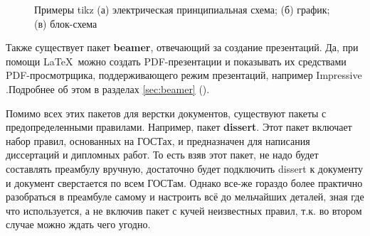 \begin{figure}[!ht]

    \caption{Примеры tikz (а) электрическая принципиальная схема; (б) график; (в) блок-схема}
    \label{fig:tikzex}
\end{figure}

Также существует пакет \textbf{beamer}, отвечающий за создание презентаций. Да, при помощи \LaTeX~можно создать PDF-презентации и показывать их средствами PDF-просмотрщика, поддерживающего режим презентаций, например Impressive .Подробнее об этом в разделах \ref{sec:beamer} ().

Помимо всех этих пакетов для верстки документов, существуют пакеты с предопределенными правилами. Например, пакет \textbf{dissert}. Этот пакет включает набор правил, основанных на ГОСТах, и предназначен для написания диссертаций и дипломных работ. То есть взяв этот пакет, не надо будет составлять преамбулу вручную, достаточно будет подключить dissert к документу и документ сверстается по всем ГОСТам. Однако все-же гораздо более практично разобраться в преамбуле самому и настроить всё до мельчайших деталей, зная где что используется, а не включив пакет с кучей неизвестных правил, т.к. во втором случае можно ждать чего угодно.

